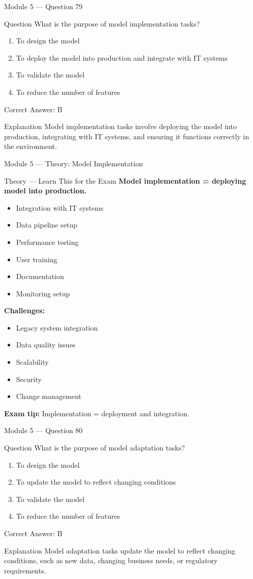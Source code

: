 \documentclass[aspectratio=169,10pt]{beamer}
\newcommand{\question}[1]{%
	\begin{block}{Question}
		#1
	\end{block}
}
\newcommand{\options}[4]{%
	\begin{enumerate}[label=\Alph*.,leftmargin=*]
		\item #1
		\item #2
		\item #3
		\item #4
	\end{enumerate}
}
\newcommand{\answerbox}[1]{%
	\begin{exampleblock}{Correct Answer: #1}
	\end{exampleblock}
}
\newcommand{\explain}[1]{%
	\begin{block}{Explanation}
		\small #1
	\end{block}
}
\newcommand{\theory}[1]{%
	\begin{block}{Theory --- Learn This for the Exam}
		\small #1
	\end{block}
}
\begin{document}
	\begin{frame}{Module 5 --- Question 79}
		\question{What is the purpose of model implementation tasks?}
		\options{To design the model}{To deploy the model into production and integrate with IT systems}{To validate the model}{To reduce the number of features}
		\answerbox{B}
		\explain{Model implementation tasks involve deploying the model into production, integrating with IT systems, and ensuring it functions correctly in the environment.}
	\end{frame}
	
	\begin{frame}{Module 5 --- Theory: Model Implementation}
		\theory{
			\textbf{Model implementation = deploying model into production.}
			\begin{itemize}
				\item Integration with IT systems
				\item Data pipeline setup
				\item Performance testing
				\item User training
				\item Documentation
				\item Monitoring setup
			\end{itemize}
			\textbf{Challenges:}
			\begin{itemize}
				\item Legacy system integration
				\item Data quality issues
				\item Scalability
				\item Security
				\item Change management
			\end{itemize}
			\textbf{Exam tip:} Implementation = deployment and integration.
		}
	\end{frame}
	
	\begin{frame}{Module 5 --- Question 80}
		\question{What is the purpose of model adaptation tasks?}
		\options{To design the model}{To update the model to reflect changing conditions}{To validate the model}{To reduce the number of features}
		\answerbox{B}
		\explain{Model adaptation tasks update the model to reflect changing conditions, such as new data, changing business needs, or regulatory requirements.}
	\end{frame}
	
\end{document}
